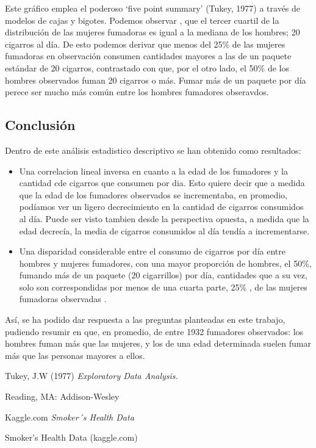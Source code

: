 \documentclass[
  stu,
  longtable,
  nolmodern,
  notxfonts,
  notimes,
  colorlinks=true,linkcolor=blue,citecolor=blue,urlcolor=blue]{apa7}
\begin{document}
Este gráfico emplea el poderoso `five point summary' (Tukey, 1977) a
través de modelos de cajas y bigotes. Podemos observar , que el tercer
cuartil de la distribución de las mujeres fumadoras es igual a la
mediana de los hombres; 20 cigarros al día. De esto podemos derivar que
menos del 25\% de las mujeres fumadoras en observación consumen
cantidades mayores a las de un paquete estándar de 20 cigarros,
contrastado con que, por el otro lado, el 50\% de los hombres observados
fuman 20 cigarros o más. Fumar más de un paquete por día perece ser
mucho más común entre los hombres fumadores obseravdos.

\subsection{Conclusión}\label{conclusiuxf3n}

Dentro de este análisis estadistico descriptivo se han obtenido como
resultados:

\begin{itemize}
\item
  Una correlacion lineal inversa en cuanto a la edad de los fumadores y
  la cantidad cde cigarros que consumen por dia. Esto quiere decir que a
  medida que la edad de los fumadores observados se incrementaba, en
  promedio, podíamos ver un ligero decrecimiento en la cantidad de
  cigarros consumidos al día. Puede ser visto tambien desde la
  perspectiva opuesta, a medida que la edad decrecía, la media de
  cigarros consumidos al día tendía a incrementarse.
\item
  Una disparidad considerable entre el consumo de cigarros por día entre
  hombres y mujeres fumadores, con una mayor proporción de hombres, el
  50\%, fumando más de un paquete (20 cigarrillos) por día, cantidades
  que a su vez, solo son correspondidas por menos de una cuarta parte,
  25\% , de las mujeres fumadoras observadas .
\end{itemize}

Así, se ha podido dar respuesta a las preguntas planteadas en este
trabajo, pudiendo resumir en que, en promedio, de entre 1932 fumadores
observados: los hombres fuman más que las mujeres, y los de una edad
determinada suelen fumar más que las personas mayores a ellos.

Tukey, J.W (1977) \emph{Exploratory Data Analysis.}

Reading, MA: Addison-Wesley

Kaggle.com \emph{Smoker´s Health Data}

Smoker's Health Data (kaggle.com)
\end{document}
